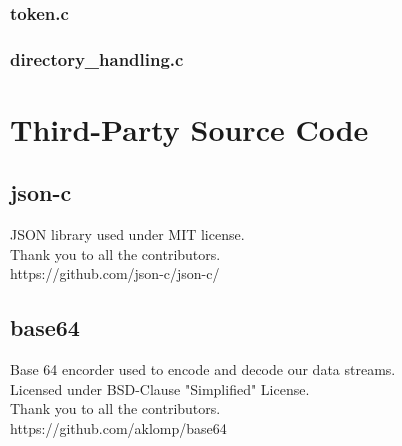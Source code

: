\documentclass{article}
\begin{document}
	\subsubsection{token.c}
	
	\subsubsection{directory\_handling.c}
	

\section{Third-Party Source Code}
\subsection{json-c}
JSON library used under MIT license.\\
Thank you to all the contributors.\\
https://github.com/json-c/json-c/\\
\subsection{base64}
Base 64 encorder used to encode and decode our data streams.\\
Licensed under BSD-Clause "Simplified" License.\\
Thank you to all the contributors.\\
https://github.com/aklomp/base64\\
\end{document}
